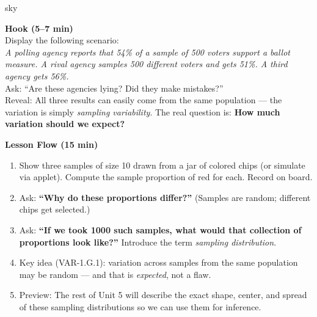 \documentclass[10pt]{article}
\begin{document}
\begin{skillbox}{sky}
\begin{minipage}[t]{0.48\linewidth}
    \textbf{Hook (5--7 min)}\\
    Display the following scenario:\\[4pt]
    \textit{A polling agency reports that 54\% of a sample of 500 voters support a
    ballot measure. A rival agency samples 500 different voters and gets 51\%. A third
    agency gets 56\%.}\\[4pt]
    Ask: ``Are these agencies lying? Did they make mistakes?''\\[4pt]
    Reveal: All three results can easily come from the same population --- the variation
    is simply \emph{sampling variability}. The real question is: \textbf{How much
    variation should we expect?}
\end{minipage}
\hfill
\begin{minipage}[t]{0.48\linewidth}
    \textbf{Lesson Flow (15 min)}
    \begin{enumerate}
        \item Show three samples of size 10 drawn from a jar of colored chips (or
              simulate via applet). Compute the sample proportion of red for each.
              Record on board.
        \item Ask: \textbf{``Why do these proportions differ?''} (Samples are random;
              different chips get selected.)
        \item Ask: \textbf{``If we took 1000 such samples, what would that collection of
              proportions look like?''} Introduce the term \emph{sampling distribution}.
        \item Key idea (VAR-1.G.1): variation across samples from the same population
              may be random --- and that is \emph{expected}, not a flaw.
        \item Preview: The rest of Unit 5 will describe the exact shape, center, and
              spread of these sampling distributions so we can use them for inference.
    \end{enumerate}
\end{minipage}
\end{skillbox}
\end{document}
